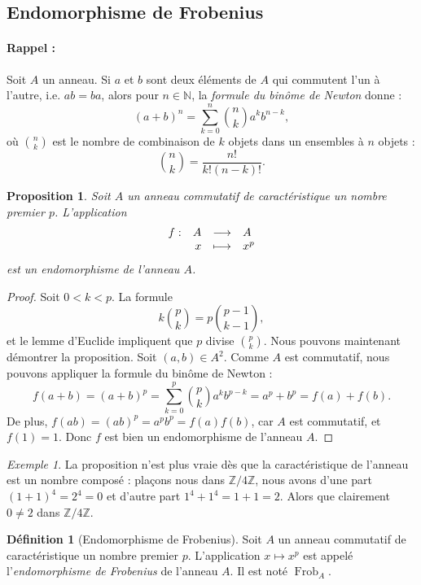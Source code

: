 \documentclass[a4paper, titlepage]{article}
\newtheorem{prop}[theo]{Proposition}
\theoremstyle{definition}
\newtheorem{defi}[theo]{Définition}
\theoremstyle{remark}
\newtheorem{exem}[theo]{Exemple}
\def\N{\mathbb N}
\def\Z{\mathbb Z}
\def\frob{\operatorname{Frob}}
\begin{document}
\subsection{Endomorphisme de Frobenius}

\paragraph*{Rappel :} Soit $A$ un anneau. Si $a$ et $b$ sont deux éléments de $A$ qui commutent l'un à l'autre, i.e. $ab = ba$, alors pour $n \in \N$, la \textit{formule du binôme de Newton} donne :
$$(a+b)^n = \sum_{k=0}^n \binom{n}{k} a^kb^{n-k},$$
où $\binom{n}{k}$ est le nombre de combinaison de $k$ objets dans un ensembles à $n$ objets : $$\binom{n}{k} = \frac{n!}{k!(n-k)!}.$$

\begin{prop}\label{propFrob}
Soit $A$ un anneau commutatif de caractéristique un nombre premier $p$. L'application 
$$\begin{array}{r r c l}
 f :& A& \longrightarrow& A \\
 & x& \longmapsto& x^p
\end{array}$$
est un endomorphisme de l'anneau $A$.
\end{prop}

\begin{proof}
Soit $0 < k < p$. La formule 
$$k\binom{p}{k} = p\binom{p-1}{k-1},$$
et le lemme d'Euclide impliquent que $p$ divise $\binom{p}{k}$. Nous pouvons maintenant démontrer la proposition. Soit $(a,b) \in A^2$. Comme $A$ est commutatif, nous pouvons appliquer la formule du binôme de Newton :
$$f(a+b)=(a+b)^p = \sum_{k=0}^p \binom{p}{k} a^kb^{p-k} = a^p + b^p=f(a)+f(b).$$
De plus, $f(ab)=(ab)^p = a^pb^p=f(a)f(b)$, car $A$ est commutatif, et $f(1) = 1$. Donc $f$ est bien un endomorphisme de l'anneau $A$.
\end{proof}

\begin{exem}
La proposition n'est plus vraie dès que la caractéristique de l'anneau est un nombre composé : plaçons nous dans $\Z/4\Z$, nous avons d'une part $(1 + 1)^4 = 2^4 = 0$ et d'autre part $1^4 + 1^4 = 1+1 = 2$. Alors que clairement $0\neq 2$ dans $\Z/4\Z$.
\end{exem}

\begin{defi}[Endomorphisme de Frobenius]
Soit $A$ un anneau commutatif de caractéristique un nombre premier $p$. L'application $x \mapsto x^p$ est appelé l'\textit{endomorphisme de Frobenius} de l'anneau $A$. Il est noté $\frob_A$.
\end{defi}
\end{document}
